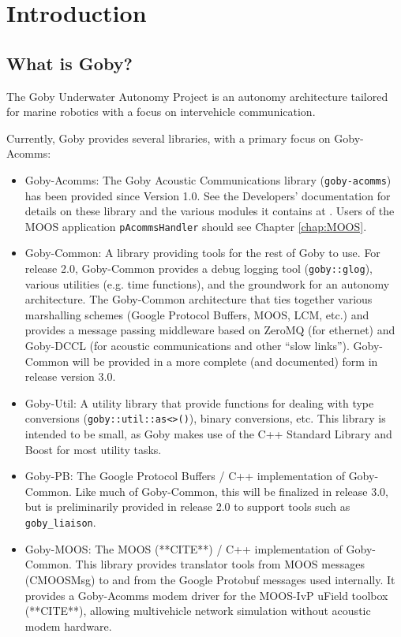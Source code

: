 \chapter{Introduction}

\section{What is Goby?}

The Goby Underwater Autonomy Project is an \gls{autonomy architecture} tailored for marine robotics with a focus on intervehicle communication.

Currently, Goby provides several libraries, with a primary focus on Goby-Acomms:

\begin{itemize}
\item Goby-Acomms: The Goby Acoustic Communications library (\verb|goby-acomms|) has been provided since Version 1.0. See the Developers' documentation for details on these library and the various modules it contains at \cite{goby-doc}. Users of the MOOS application \verb|pAcommsHandler| should see Chapter \ref{chap:MOOS}.
\item Goby-Common: A library providing tools for the rest of Goby to use. For release 2.0, Goby-Common provides a debug logging tool (\verb|goby::glog|), various utilities (e.g. time functions), and the groundwork for an \gls{autonomy architecture}. The Goby-Common architecture that ties together various marshalling schemes (Google Protocol Buffers, MOOS, LCM, etc.) and provides a message passing middleware based on ZeroMQ (for ethernet) and Goby-DCCL (for acoustic communications and other ``slow links''). Goby-Common will be provided in a more complete (and documented) form in release version 3.0.
\item Goby-Util: A utility library that provide functions for dealing with type conversions (\verb|goby::util::as<>()|), binary conversions, etc. This library is intended to be small, as Goby makes use of the C++ Standard Library and Boost for most utility tasks.
\item Goby-PB: The Google Protocol Buffers / C++ implementation of Goby-Common. Like much of Goby-Common, this will be finalized in release 3.0, but is preliminarily provided in release 2.0 to support tools such as \verb|goby_liaison|.
\item Goby-MOOS: The MOOS (**CITE**) / C++ implementation of Goby-Common. This library provides translator tools from MOOS messages (CMOOSMsg) to and from the Google Protobuf messages used internally. It provides a Goby-Acomms modem driver for the MOOS-IvP uField toolbox (**CITE**), allowing multivehicle network simulation without acoustic modem hardware.
\end{itemize}

